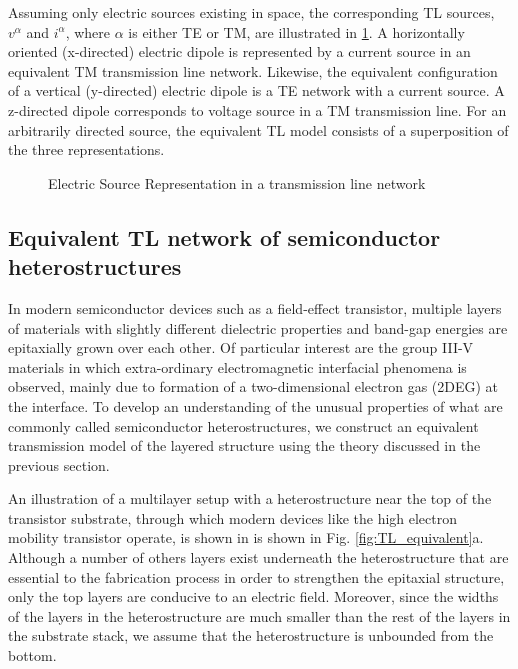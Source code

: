 \documentclass[11pt]{article}
\begin{document}
%
Assuming only electric sources existing in space, the corresponding TL sources, $v^{\alpha}$ and $i^{\alpha}$, where $\alpha$ is either TE or TM, are illustrated in \ref{fig:J_sources}. A horizontally oriented (x-directed) electric dipole is represented by a current source in an equivalent TM transmission line network. Likewise, the equivalent configuration of a vertical (y-directed) electric dipole is a TE network with a current source. A z-directed dipole corresponds to voltage source in a TM transmission line. For an arbitrarily directed source, the equivalent TL model consists of a superposition of the three representations.
%
\begin{figure}[h]
  \centering
    \newline
    \newline \centering
   \newline
  \caption{Electric Source Representation in a transmission line network}
  \label{fig:J_sources}
\end{figure}
\subsection{Equivalent TL network of semiconductor heterostructures}
%
In modern semiconductor devices such as a field-effect transistor, multiple layers of materials with slightly different dielectric properties and band-gap energies are epitaxially grown over each other. Of particular interest are the group III-V materials in which extra-ordinary electromagnetic interfacial phenomena is observed, mainly due to formation of a two-dimensional electron gas (2DEG) at the interface. To develop an understanding of the unusual properties of what are commonly called semiconductor heterostructures, we construct an equivalent transmission model of the layered structure using the theory discussed in the previous section.

An illustration of a multilayer setup with a heterostructure near the top of the transistor substrate, through which modern devices like the high electron mobility transistor operate, is shown in is shown in Fig. \ref{fig:TL_equivalent}a. Although a number of others layers exist underneath the heterostructure that are essential to the fabrication process in order to strengthen the epitaxial structure, only the top layers are conducive to an electric field. Moreover, since the widths of the layers in the heterostructure are much smaller than the rest of the layers in the substrate stack, we assume that the heterostructure is unbounded from the bottom.
\end{document}
